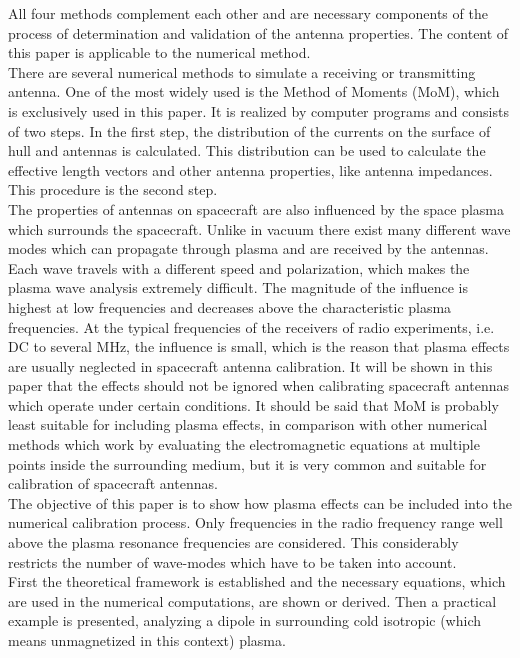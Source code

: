 \documentclass[draft,ras]{agutex}
\begin{document}
\begin{article}
All four methods complement each other and are necessary components of the process of determination and validation of the antenna properties. The content of this paper is applicable to the numerical method.\\

There are several numerical methods to simulate a receiving or transmitting antenna. One of the most widely used is the Method of Moments (MoM), which is exclusively used in this paper. It is realized by computer programs and consists of two steps. In the first step, the distribution of the currents on the surface of hull and antennas is calculated. This distribution can be used to calculate the effective length vectors and other antenna properties, like antenna impedances. This procedure is the second step.\\

The properties of antennas on spacecraft are also influenced by the space plasma which surrounds the spacecraft. Unlike in vacuum there exist many different wave modes which can propagate through plasma and are received by the antennas. Each wave travels with a different speed and polarization, which makes the plasma wave analysis extremely difficult. The magnitude of the influence is highest at low frequencies and decreases above the characteristic plasma frequencies. At the typical frequencies of the receivers of radio experiments, i.e. DC to several MHz, the influence is small, which is the reason that plasma effects are usually neglected in spacecraft antenna calibration. It will be shown in this paper that the effects should not be ignored when calibrating spacecraft antennas which operate under certain conditions. It should be said that MoM is probably least suitable for including plasma effects, in comparison with other numerical methods which work by evaluating the electromagnetic equations at multiple points inside the surrounding medium, but it is very common and suitable for calibration of spacecraft antennas.\\

The objective of this paper is to show how plasma effects can be included into the numerical calibration process. Only frequencies in the radio frequency range well above the plasma resonance frequencies are considered. This considerably restricts the number of wave-modes which have to be taken into account.\\

First the theoretical framework is established and the necessary equations, which are used in the numerical computations, are shown or derived. Then a practical example is presented, analyzing a dipole in surrounding cold isotropic (which means unmagnetized in this context) plasma.\\


\end{article}
\end{document}
